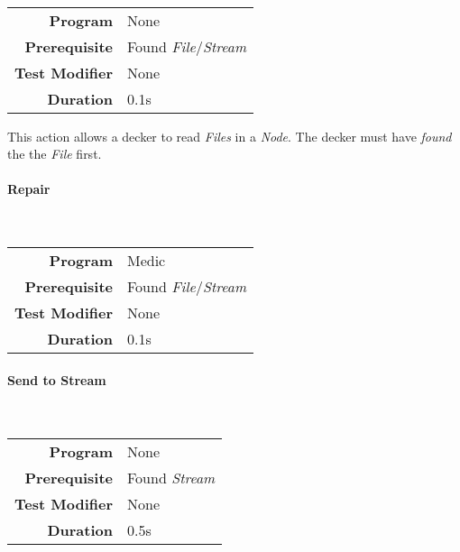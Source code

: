 \mbox{}\\

\begin{tabular}{rl}
    \textbf{Program}       & None                            \\
    \textbf{Prerequisite}  & Found \emph{File}/\emph{Stream} \\
    \textbf{Test Modifier} & None                            \\
    \textbf{Duration}      & 0.1s                            \\
\end{tabular}

\hfill

This action allows a decker to read \emph{Files} in a \emph{Node}. The decker must have
\emph{found} the the \emph{File} first.

\paragraph{Repair}
\label{par: repair}

\mbox{}\\

\begin{tabular}{rl}
    \textbf{Program}       & Medic                           \\
    \textbf{Prerequisite}  & Found \emph{File}/\emph{Stream} \\
    \textbf{Test Modifier} & None                            \\
    \textbf{Duration}      & 0.1s                            \\
\end{tabular}

\hfill


\paragraph{Send to Stream}
\label{par: send to stream}

\mbox{}\\

\begin{tabular}{rl}
    \textbf{Program}       & None                \\
    \textbf{Prerequisite}  & Found \emph{Stream} \\
    \textbf{Test Modifier} & None                \\
    \textbf{Duration}      & 0.5s                \\
\end{tabular}

